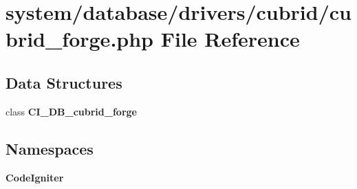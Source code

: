 \section{system/database/drivers/cubrid/cubrid\-\_\-forge.php File Reference}
\label{cubrid__forge_8php}
\subsection*{Data Structures}
\begin{DoxyCompactItemize}
\item 
class {\bf C\-I\-\_\-\-D\-B\-\_\-cubrid\-\_\-forge}
\end{DoxyCompactItemize}
\subsection*{Namespaces}
\begin{DoxyCompactItemize}
\item 
{\bf Code\-Igniter}
\end{DoxyCompactItemize}
